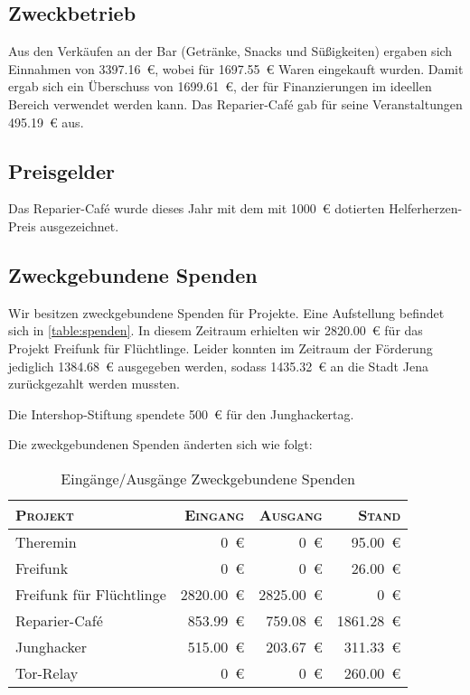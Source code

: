 \documentclass[ngerman]{scrartcl}
\begin{document}
\subsection{Zweckbetrieb}
\label{sec:Zweckbetrieb}
Aus den Verkäufen an der Bar (Getränke, Snacks und Süßigkeiten) ergaben sich Einnahmen von \num{3397,16}~\euro{}, wobei für \num{1697,55}~\euro{} Waren eingekauft wurden.
Damit ergab sich ein Überschuss von \num{1699,61}~\euro{}, der für Finanzierungen im ideellen Bereich verwendet werden kann.
Das Reparier-Café gab für seine Veranstaltungen \num{495,19}~\euro{} aus.


\subsection{Preisgelder}
\label{sec:preisgelder}

Das Reparier-Café wurde dieses Jahr mit dem mit \num{1000}~\euro{} dotierten Helferherzen-Preis ausgezeichnet.

\subsection{Zweckgebundene Spenden}
\label{sec:zweckgebundene_spenden}
Wir besitzen zweckgebundene Spenden für Projekte. Eine Aufstellung befindet sich in \autoref{table:spenden}.
In diesem Zeitraum erhielten wir \num{2820,00}~\euro{} für das Projekt Freifunk für Flüchtlinge.
Leider konnten im Zeitraum der Förderung jediglich \num{1384,68}~\euro{} ausgegeben werden,
sodass \num{1435,32}~\euro{} an die Stadt Jena zurückgezahlt werden mussten.

Die Intershop-Stiftung spendete \num{500}~\euro{} für den Junghackertag.

Die zweckgebundenen Spenden änderten sich wie folgt:

\begin{table}[h]
	\centering
	\begin{tabular}{l|r|r|r}
	\toprule
	\textsc{Projekt} & \textsc{Eingang} & \textsc{Ausgang} & \textsc{Stand} \\
	\midrule
	Theremin & \num{0}~\euro{} & \num{0}~\euro{} & \num{95,00}~\euro{} \\
	Freifunk & \num{0}~\euro{} & \num{0}~\euro{} & \num{26,00}~\euro{} \\
	Freifunk für Flüchtlinge & \num{2820,00}~\euro{} & \num{2825,00}~\euro{} & \num{0}~\euro{} \\
	Reparier-Café & \num{853,99}~\euro{} & \num{759,08}~\euro{} & \num{1861,28}~\euro{} \\
	Junghacker & \num{515,00}~\euro{} & \num{203,67}~\euro{} & \num{311,33}~\euro{} \\
	Tor-Relay & \num{0}~\euro{} & \num{0}~\euro{} & \num{260,00}~\euro{} \\
\bottomrule
	\end{tabular}
	\caption{Eingänge/Ausgänge Zweckgebundene Spenden}
	\label{table:spenden}
\end{table}
\end{document}

